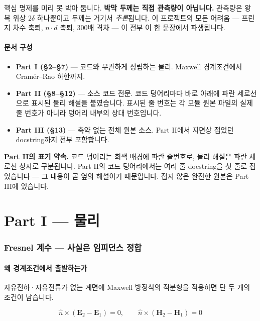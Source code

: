 \documentclass[10pt,a4paper]{article}
\newcommand{\note}[1]{%
  \begin{tcolorbox}[enhanced,breakable,colback=white,colframe=accent,
    boxrule=0pt,leftrule=1.6pt,arc=0pt,outer arc=0pt,
    left=6pt,right=2pt,top=3pt,bottom=3pt,boxsep=0pt,
    before skip=5pt, after skip=8pt]
  #1
  \end{tcolorbox}}
\begin{document}
핵심 명제를 미리 못 박아 둡니다. \textbf{박막 두께는 직접 관측량이 아닙니다.} 관측량은 왕복 위상 $2\delta$ 하나뿐이고 두께는 거기서 \emph{추론}됩니다. 이 프로젝트의 모든 어려움 — 프린지 차수 축퇴, $n\cdot d$ 축퇴, 300배 격차 — 이 전부 이 한 문장에서 파생됩니다.

\subsection*{문서 구성}

\begin{itemize}[leftmargin=14pt,itemsep=2pt]
\item \textbf{Part I (§2--§7)} — 코드와 무관하게 성립하는 물리. Maxwell 경계조건에서 Cramér--Rao 하한까지.
\item \textbf{Part II (§8--§12)} — 소스 코드 전문. 코드 덩어리마다 바로 아래에 파란 세로선으로 표시된 물리 해설을 붙였습니다. 표시된 줄 번호는 각 모듈 원본 파일의 실제 줄 번호가 아니라 덩어리 내부의 상대 번호입니다.
\item \textbf{Part III (§13)} — 축약 없는 전체 원본 소스. Part II에서 지면상 접었던 docstring까지 전부 포함합니다.
\end{itemize}

\note{\textbf{Part II의 표기 약속.} 코드 덩어리는 회색 배경에 파란 줄번호로, 물리 해설은 파란 세로선 상자로 구분됩니다. Part II의 코드 덩어리에서는 여러 줄 docstring을 첫 줄로 접었습니다 — 그 내용이 곧 옆의 해설이기 때문입니다. 접지 않은 완전한 원본은 Part III에 있습니다.}

\part*{\color{accent}Part I — 물리}

\section{Fresnel 계수 — 사실은 임피던스 정합}

\subsection{왜 경계조건에서 출발하는가}

자유전하·자유전류가 없는 계면에 Maxwell 방정식의 적분형을 적용하면 단 두 개의 조건이 남습니다.

\begin{equation}
\hat n \times (\mathbf{E}_2 - \mathbf{E}_1) = 0, \qquad
\hat n \times (\mathbf{H}_2 - \mathbf{H}_1) = 0
\end{equation}
\end{document}

